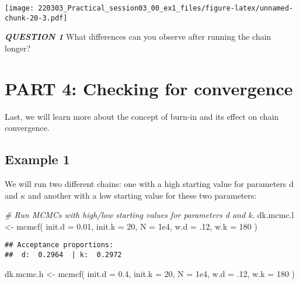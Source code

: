 \documentclass[
]{article}
\newenvironment{Shaded}{\begin{snugshade}}{\end{snugshade}}
\newcommand{\AttributeTok}[1]{\textcolor[rgb]{0.77,0.63,0.00}{#1}}
\newcommand{\CommentTok}[1]{\textcolor[rgb]{0.56,0.35,0.01}{\textit{#1}}}
\newcommand{\DecValTok}[1]{\textcolor[rgb]{0.00,0.00,0.81}{#1}}
\newcommand{\FloatTok}[1]{\textcolor[rgb]{0.00,0.00,0.81}{#1}}
\newcommand{\FunctionTok}[1]{\textcolor[rgb]{0.00,0.00,0.00}{#1}}
\newcommand{\NormalTok}[1]{#1}
\newcommand{\OtherTok}[1]{\textcolor[rgb]{0.56,0.35,0.01}{#1}}
\begin{document}
\texttt{[image: 220303\_Practical\_session03\_00\_ex1\_files/figure-latex/unnamed-chunk-20-3.pdf]}

\emph{\textbf{QUESTION 1}} What differences can you observe after
running the chain longer?

\hypertarget{part-4-checking-for-convergence}{%
\section{PART 4: Checking for
convergence}\label{part-4-checking-for-convergence}}

Last, we will learn more about the concept of burn-in and its effect on
chain convergence.

\hypertarget{example-1-1}{%
\subsection{Example 1}\label{example-1-1}}

We will run two different chains: one with a high starting value for
parameters d and \(\kappa\) and another with a low starting value for
these two parameters:

\begin{Shaded}
\begin{Highlighting}[]
\CommentTok{\# Run MCMCs with high/low starting values for parameters d and k.}
\NormalTok{dk.mcmc.l }\OtherTok{\textless{}{-}} \FunctionTok{mcmcf}\NormalTok{( }\AttributeTok{init.d =} \FloatTok{0.01}\NormalTok{, }\AttributeTok{init.k =} \DecValTok{20}\NormalTok{, }\AttributeTok{N =} \FloatTok{1e4}\NormalTok{,}
                    \AttributeTok{w.d =}\NormalTok{ .}\DecValTok{12}\NormalTok{, }\AttributeTok{w.k =} \DecValTok{180}\NormalTok{ )}
\end{Highlighting}
\end{Shaded}

\begin{verbatim}
## Acceptance proportions:
##  d:  0.2964  | k:  0.2972
\end{verbatim}

\begin{Shaded}
\begin{Highlighting}[]
\NormalTok{dk.mcmc.h }\OtherTok{\textless{}{-}} \FunctionTok{mcmcf}\NormalTok{( }\AttributeTok{init.d =} \FloatTok{0.4}\NormalTok{, }\AttributeTok{init.k =} \DecValTok{20}\NormalTok{, }\AttributeTok{N =} \FloatTok{1e4}\NormalTok{,}
                    \AttributeTok{w.d =}\NormalTok{ .}\DecValTok{12}\NormalTok{, }\AttributeTok{w.k =} \DecValTok{180}\NormalTok{ )}
\end{Highlighting}
\end{Shaded}
\end{document}
